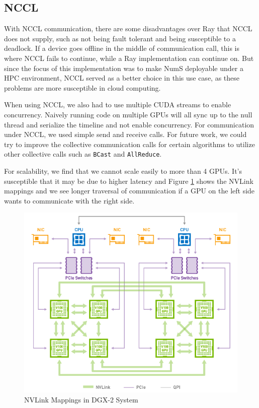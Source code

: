 \documentclass{article}
\begin{document}
\subsection{NCCL}
With NCCL communication, there are some disadvantages over Ray that NCCL does not supply, such as not being fault tolerant and being susceptible to a deadlock. If a device goes offline in the middle of communication call, this is where NCCL fails to continue, while a Ray implementation can continue on. But since the focus of this implementation was to make NumS deployable under a HPC environment, NCCL served as a better choice in this use case, as these problems are more susceptible in cloud computing. 

When using NCCL, we also had to use multiple CUDA streams to enable concurrency. Naively running code on multiple GPUs will all sync up to the null thread and serialize the timeline and not enable concurrency. For communication under NCCL, we used simple send and receive calls. For future work, we could try to improve the collective communication calls for certain algorithms to utilize other collective calls such as \verb|BCast| and \verb|AllReduce|.

For scalability, we find that we cannot scale easily to more than 4 GPUs. It's susceptible that it may be due to higher latency and 
Figure \ref{fig:nvlink} shows the NVLink mappings and we see longer traversal of communication if a GPU on the left side wants to communicate with the right side. 

\begin{figure}
  \centerline{\includegraphics[width=5in]{figures/nvlink.png}}
  \caption{NVLink Mappings in DGX-2 System}
  \label{fig:nvlink}
\end{figure}
\end{document}
